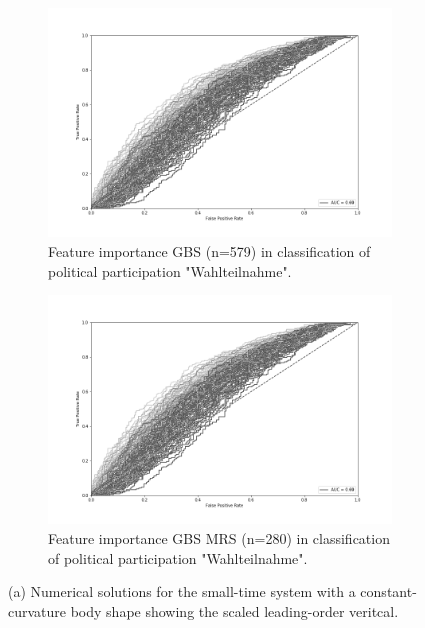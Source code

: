 \begin{figure}
\centering
\begin{subfigure}[b]{0.8\textwidth}
		\includegraphics[scale=0.42,angle=0]{fig/Roc_BFI-10}
   \caption{Feature importance GBS (n=579) in classification of political participation "Wahlteilnahme".}
   \label{fig:Ng1} 
\end{subfigure}

\begin{subfigure}[b]{0.8\textwidth}
\vspace{0.55cm}
		\includegraphics[scale=0.42,angle=0]{fig/Roc_BFI-10}
   \caption{Feature importance GBS MRS (n=280) in classification of political participation "Wahlteilnahme".}
   \label{fig:Ng2}
\end{subfigure}
\vspace{0.35cm}
\caption[Two numerical solutions]{(a) Numerical solutions for the small-time system 
with a constant-curvature body shape showing the scaled leading-order veritcal.}
\end{figure}



